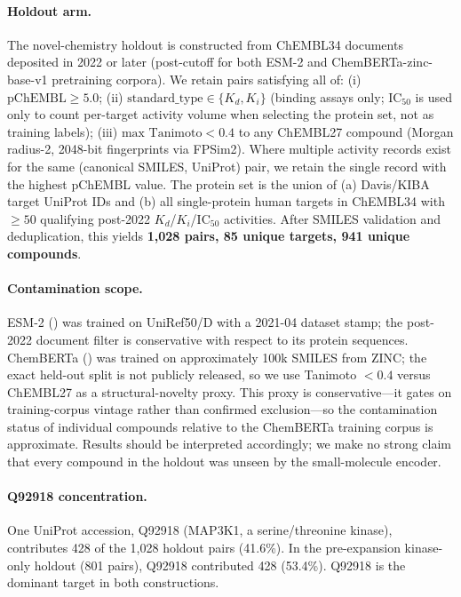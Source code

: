 \documentclass[11pt,a4paper]{article}
\begin{document}
\paragraph{Holdout arm.}
The novel-chemistry holdout is constructed from ChEMBL34
\citep{zdrazil2024chembl34} documents deposited in 2022 or later (post-cutoff
for both ESM-2 and ChemBERTa-zinc-base-v1 pretraining corpora).
We retain pairs satisfying all of:
(i) $\text{pChEMBL} \geq 5.0$;
(ii) $\text{standard\_type} \in \{K_d, K_i\}$ (binding assays only; IC$_{50}$ is
used only to count per-target activity volume when selecting the protein set,
not as training labels);
(iii) $\text{max Tanimoto} < 0.4$ to any ChEMBL27 compound (Morgan
radius-2, 2048-bit fingerprints via FPSim2).
Where multiple activity records exist for the same (canonical SMILES,
UniProt) pair, we retain the single record with the highest pChEMBL value.
The protein set is the union of (a) Davis/KIBA target UniProt IDs and (b) all
single-protein human targets in ChEMBL34 with $\geq 50$ qualifying post-2022
$K_d$/$K_i$/$\text{IC}_{50}$ activities.
After SMILES validation and deduplication, this yields
\textbf{1{,}028 pairs, 85 unique targets, 941 unique compounds}.

\paragraph{Contamination scope.}
ESM-2 () was trained on UniRef50/D with a
2021-04 dataset stamp; the post-2022 document filter is conservative with
respect to its protein sequences.
ChemBERTa () was trained on
approximately 100k SMILES from ZINC; the exact held-out split is not publicly
released, so we use Tanimoto $< 0.4$ versus ChEMBL27 as a structural-novelty
proxy.
This proxy is conservative---it gates on training-corpus vintage rather than
confirmed exclusion---so the contamination status of individual compounds
relative to the ChemBERTa training corpus is approximate.
Results should be interpreted accordingly; we make no strong claim that every
compound in the holdout was unseen by the small-molecule encoder.

\paragraph{Q92918 concentration.}
One UniProt accession, Q92918 (MAP3K1, a serine/threonine kinase), contributes
428 of the 1{,}028 holdout pairs (41.6\%).
In the pre-expansion kinase-only holdout (801 pairs), Q92918 contributed 428
(53.4\%).
Q92918 is the dominant target in both constructions.
\end{document}
